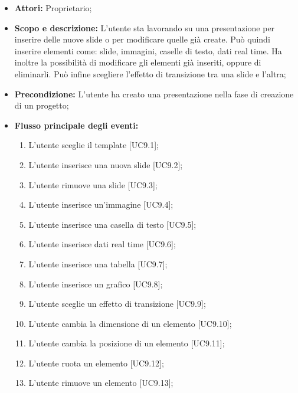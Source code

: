 \begin{itemize}
	\item \textbf{Attori:} Proprietario;
	\item \textbf{Scopo e descrizione:} L'utente sta lavorando su una presentazione per inserire delle nuove slide o per modificare quelle già create. Può quindi inserire  elementi come: slide, immagini, caselle di testo, dati real time. Ha inoltre la possibilità di modificare gli elementi già inseriti, oppure di eliminarli. Può infine scegliere l'effetto di transizione tra una slide e l'altra;
	\item \textbf{Precondizione:} L'utente ha creato una presentazione nella fase di creazione di un progetto;
	\item \textbf{Flusso principale degli eventi:}
	\begin{enumerate}
		
		\item L'utente sceglie il template [UC9.1];
		
		\item L'utente inserisce una nuova slide [UC9.2];
		\item L'utente rimuove una slide [UC9.3];
		
		\item L'utente inserisce un'immagine [UC9.4];
		
		\item L'utente inserisce una casella di testo [UC9.5];
		
		\item L'utente inserisce dati real time [UC9.6];
		
		\item L'utente inserisce una tabella [UC9.7];
		
		\item L'utente inserisce un grafico [UC9.8];
		
		\item L'utente sceglie un effetto di transizione [UC9.9];
		
		\item L'utente cambia la dimensione di un elemento [UC9.10];
		
		\item L'utente cambia la posizione di un elemento [UC9.11];
		
		\item L'utente ruota un elemento [UC9.12];
		
		\item L'utente rimuove un elemento [UC9.13];
		

\end{enumerate}
\end{itemize}
